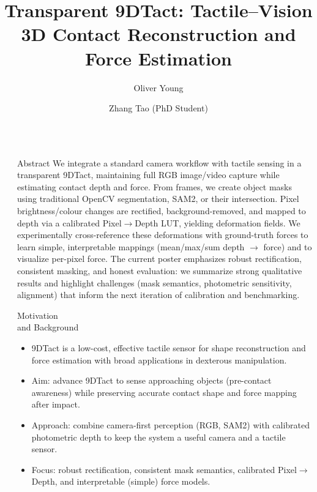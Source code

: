 \documentclass[final]{beamer}
\title{Transparent 9DTact: Tactile--Vision 3D Contact Reconstruction and Force Estimation}
\author{Oliver Young \inst{1} \and Zhang Tao (PhD Student) \inst{1}}
\institute[shortinst]{\inst{1} The Chinese University of Hong Kong \inst{2} University of California, Santa Cruz\\
  Supervisor: Prof. [Hongming Ren]}
\newlength{\sepwidth}
\newlength{\colwidth}
\newcommand{\separatorcolumn}{\begin{column}{\sepwidth}\end{column}}
\begin{document}

\begin{frame}[t]
\begin{columns}[t]
\separatorcolumn

\begin{column}{\colwidth}

  \begin{block}{Abstract}
  We integrate a standard camera workflow with tactile sensing in a transparent 9DTact, maintaining full RGB image/video capture while estimating contact depth and force. From frames, we create object masks using traditional OpenCV segmentation, SAM2, or their intersection. Pixel brightness/colour changes are rectified, background-removed, and mapped to depth via a calibrated Pixel$\rightarrow$Depth LUT, yielding deformation fields. We experimentally cross-reference these deformations with ground-truth forces to learn simple, interpretable mappings (mean/max/sum depth $\rightarrow$ force) and to visualize per-pixel force. The current poster emphasizes robust rectification, consistent masking, and honest evaluation: we summarize strong qualitative results and highlight challenges (mask semantics, photometric sensitivity, alignment) that inform the next iteration of calibration and benchmarking.
  \end{block}

  \begin{block}{Motivation \\ and Background}
  \begin{itemize}
    \item 9DTact is a low-cost, effective tactile sensor for shape reconstruction and force estimation with broad applications in dexterous manipulation.
    \item Aim: advance 9DTact to sense approaching objects (pre-contact awareness) while preserving accurate contact shape and force mapping after impact.
    \item Approach: combine camera-first perception (RGB, SAM2) with calibrated photometric depth to keep the system a useful camera and a tactile sensor.
    \item Focus: robust rectification, consistent mask semantics, calibrated Pixel$\rightarrow$Depth, and interpretable (simple) force models.
  \end{itemize}
  \end{block}


\end{column}
\end{columns}
\end{frame}
\end{document}

